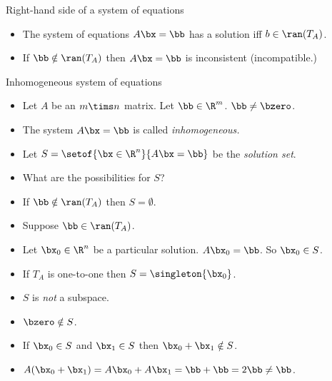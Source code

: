 \documentclass{beamer}
\begin{document}

\begin{frame}{Right-hand side of a system of equations}

\begin{itemize}
\item The system of equations $A\bx=\bb$ has a solution iff $b\in\ran(T_A)$.
\item If $\bb\notin\ran(T_A)$ then $A\bx=\bb$ is inconsistent (incompatible.)
\end{itemize}

\end{frame}


\begin{frame}{Inhomogeneous system of equations}

\begin{itemize}
\item Let $A$ be an $m\tims n$ matrix. Let $\bb\in\R^m$. $\bb\not=\bzero$.
\item The system $A\bx=\bb$ is called \emph{inhomogeneous.}
\item Let $S=\setof{\bx \in \R^n}{A \bx = \bb}$ be the \emph{solution set}.
\item What are the possibilities for $S$?
\item If $\bb\notin\ran(T_A)$ then $S=\emptyset$.
\item Suppose $\bb\in\ran(T_A)$.
\item Let $\bx_0\in\R^n$ be a particular solution. $A\bx_0=\bb$. So $\bx_0\in S$.
\item If $T_A$ is one-to-one then $S=\singleton{\bx_0}$.
\item $S$ is \emph{not} a subspace.
\item $\bzero\notin S$.
\item If $\bx_0\in S$ and $\bx_1\in S$ then $\bx_0+\bx_1\notin S$.
\item $A(\bx_0+\bx_1) = A\bx_0+A\bx_1 = \bb+\bb = 2\bb \not= \bb$.
\end{itemize}

\end{frame}



\end{document}
